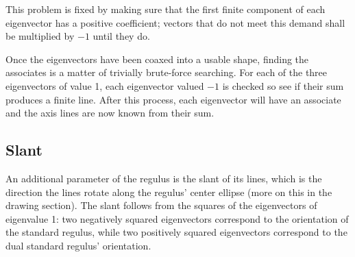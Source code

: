 \documentclass[a4paper, 10pt]{article}
\begin{document}
This problem is fixed by making sure that the first finite component of each
eigenvector has a positive coefficient; vectors that do not meet this demand
shall be multiplied by $-1$ until they do.

Once the eigenvectors have been coaxed into a usable shape, finding the
associates is a matter of trivially brute-force searching. For each of the three
eigenvectors of value 1, each eigenvector valued $-1$ is checked so see if their
sum produces a finite line. After this process, each eigenvector will have an
associate and the axis lines are now known from their sum.

\subsection{Slant}
An additional parameter of the regulus is the slant of its lines, which is the
direction the lines rotate along the regulus' center ellipse (more on this in
the drawing section). The slant follows from the squares of the eigenvectors of
eigenvalue 1: two negatively squared eigenvectors correspond to the orientation
of the standard regulus, while two positively squared eigenvectors correspond to
the dual standard regulus' orientation.



\end{document}
